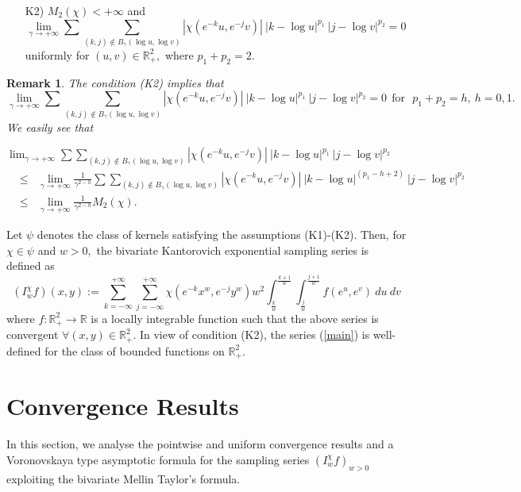 \documentclass[12pt]{article}
\newtheorem{rmk}{Remark}[section]
\begin{document}
{\begin{itemize}
\item[K2)]$ M_{2}(\chi) < +\infty$ and
$$ \lim_{\gamma \rightarrow + \infty} \sum \sum_{(k,j) \notin  B_{\gamma}(\log u,\log v)}|\chi(e^{-k} u, e^{-j}v)| \ |k- \log u|^{p_{1}} \ |j- \log v|^{p_{2}}=0$$ uniformly for $ (u,v) \in \mathbb{R}^{2}_{+},$ where $p_{1}+p_{2}= 2.$
\end{itemize}

\begin{rmk}
The condition (K2) implies that
$$\lim_{\gamma \rightarrow + \infty} \sum \sum_{(k,j) \notin  B_{\gamma}(\log u,\log v)} |\chi(e^{-k} u, e^{-j}v)| \ |k- \log u|^{p_{1}} \ |j- \log v|^{p_{2}}=0 \ \ \mbox{for}\ \ \ p_{1}+p_{2}=h,\ h=0,1.$$
We easily see that

\noindent $\displaystyle \lim_{\gamma \rightarrow + \infty} \sum \sum_{(k,j) \notin  B_{\gamma}(\log u,\log v)}|\chi(e^{-k} u, e^{-j}v)| \ |k- \log u|^{p_{1}} \ |j- \log v|^{p_{2}}$
\begin{eqnarray*}
&\leq &  \lim_{\gamma \rightarrow + \infty} \frac{1}{\gamma^{2-h}} \sum \sum_{(k,j) \notin  B_{\gamma}(\log u,\log v)}|\chi(e^{-k} u, e^{-j}v)| \ |k- \log u|^{(p_{1}-h+2)} \ |j- \log v|^{p_{2}} \\
&\leq & \lim_{\gamma \rightarrow + \infty} \frac{1}{\gamma^{2-h}} M_{2}(\chi).
\end{eqnarray*}
\end{rmk}

Let $\psi$ denotes the class of kernels satisfying the assumptions (K1)-(K2). Then, for $\chi \in \psi$ and $w>0,$ the bivariate Kantorovich exponential sampling series is defined as
\begin{equation} \label{main}
(I^{\chi}_{w} f)(x,y) := \sum_{k= - \infty}^{+\infty} \sum_{j= - \infty}^{+\infty} \chi(e^{-k}x^w, e^{-j}y^w) w^{2}  \int_{\frac{k}{w}}^{\frac{k+1}{w}} \int_{\frac{j}{w}}^{\frac{j+1}{w}} f(e^u,e^v)\  du \ dv
\end{equation}
where $f : \mathbb{R}^{2}_{+} \rightarrow \mathbb{R} $ is a locally integrable function such that the above series is convergent $\forall (x,y) \in \mathbb{R}^{2}_{+}.$ In view of condition (K2), the series (\ref{main}) is well-defined for the class of bounded functions on $\mathbb{R}^{2}_{+}.$

\section{Convergence Results}
In this section, we analyse the pointwise and uniform convergence results and a Voronovskaya type asymptotic formula for the sampling series $(I_{w}^{\chi}f)_{w>0}$ exploiting the bivariate Mellin Taylor's formula.

}
\end{document}
